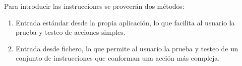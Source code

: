    Para introducir las instrucciones se proveerán dos métodos: 
   \begin{enumerate}
      \item Entrada estándar desde la propia aplicación, lo que facilita al usuario la prueba y testeo de acciones simples. 
      \item Entrada desde fichero, lo que permite al usuario la prueba y testeo de un conjunto de instrucciones que conforman una acción más compleja.\\
   \end{enumerate}















